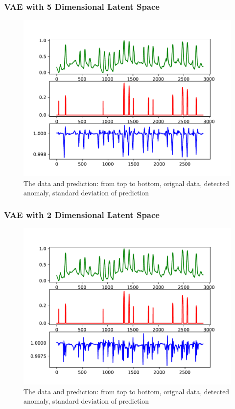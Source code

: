 \documentclass{beamer}
\begin{document}
\begin{frame}
\frametitle{VAE with 5 Dimensional Latent Space}
\begin{figure}
\includegraphics[width=0.8\linewidth]{figs/vae_h5_detect.pdf}
\vspace{-0.3in}
\caption{The data and prediction: from top to bottom, orignal data, detected anomaly, standard deviation of prediction}
\end{figure}
\end{frame}

\begin{frame}
\frametitle{VAE with 2 Dimensional Latent Space}
\begin{figure}
\includegraphics[width=0.8\linewidth]{figs/vae_h2_detect.pdf}
\vspace{-0.3in}
\caption{The data and prediction: from top to bottom, orignal data, detected anomaly, standard deviation of prediction}
\end{figure}
\end{frame}
\end{document}
